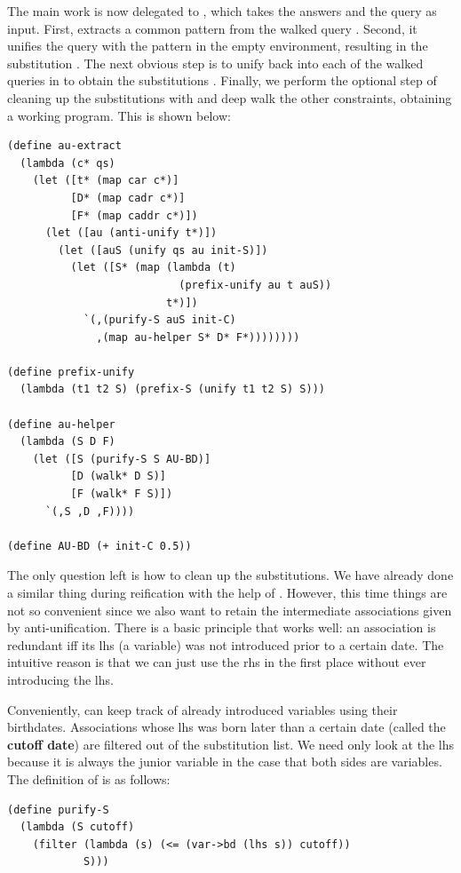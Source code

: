 The main work is now delegated to , which takes the answers and the query as input. First,  extracts a common pattern  from the walked query . Second, it unifies the query with the pattern in the empty environment, resulting in the substitution . The next obvious step is to unify  back into each of the walked queries in  to obtain the substitutions . Finally, we perform the optional step of cleaning up the substitutions with  and deep walk the other constraints, obtaining a working program. This is shown below:
\begin{lstlisting}
(define au-extract
  (lambda (c* qs)
    (let ([t* (map car c*)]
          [D* (map cadr c*)]
          [F* (map caddr c*)])
      (let ([au (anti-unify t*)])
        (let ([auS (unify qs au init-S)])
          (let ([S* (map (lambda (t)
                           (prefix-unify au t auS))
                         t*)])
            `(,(purify-S auS init-C)
              ,(map au-helper S* D* F*))))))))

(define prefix-unify
  (lambda (t1 t2 S) (prefix-S (unify t1 t2 S) S)))

(define au-helper
  (lambda (S D F)
    (let ([S (purify-S S AU-BD)]
          [D (walk* D S)]
          [F (walk* F S)])
      `(,S ,D ,F))))

(define AU-BD (+ init-C 0.5))
\end{lstlisting}

The only question left is how to clean up the substitutions. We have already done a similar thing during reification with the help of . However, this time things are not so convenient since we also want to retain the intermediate associations given by anti-unification. There is a basic principle that works well: an association is redundant iff its lhs (a variable) was not introduced prior to a certain date. The intuitive reason is that we can just use the rhs in the first place without ever introducing the lhs.

Conveniently,  can keep track of already introduced variables using their birthdates. Associations whose lhs was born later than a certain date (called the \textbf{cutoff date}) are filtered out of the substitution list. We need only look at the lhs because it is always the junior variable in the case that both sides are variables. The definition of  is as follows:
\begin{lstlisting}
(define purify-S
  (lambda (S cutoff)
    (filter (lambda (s) (<= (var->bd (lhs s)) cutoff))
            S)))
\end{lstlisting}

